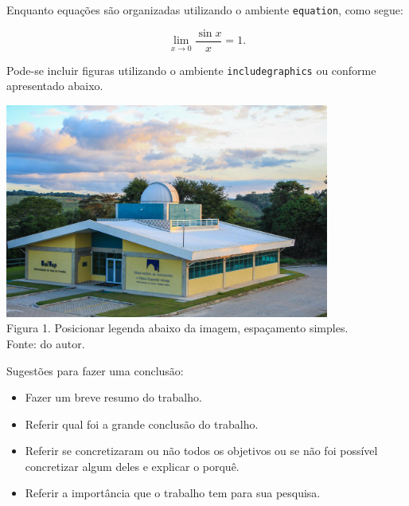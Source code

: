 \documentclass[a0paper,portrait]{baposter}
\begin{document}
\begin{poster}
{Enquanto equações são organizadas utilizando o ambiente \texttt{equation}, como segue:

\begin{equation}
    \label{eq:eq1}
    \lim_{x\to 0}\dfrac{\sin x}{x}=1.
\end{equation}

\vspace{0.8cm}

}

{Pode-se incluir figuras utilizando o ambiente \texttt{includegraphics} ou conforme apresentado abaixo.

\begin{center}
\includegraphics[width=0.8\textwidth]{figures/observatorio.jpg}\\
Figura 1. Posicionar legenda abaixo da imagem, espaçamento simples.\\
Fonte: do autor.
\end{center}

\vspace{1.3cm}
\vspace{9cm}

}

{Sugestões para fazer uma conclusão:
\begin{itemize}
    \item Fazer um breve resumo do trabalho.
    \item Referir qual foi a grande conclusão do trabalho.
    \item Referir se concretizaram ou não todos os objetivos ou se não foi possível concretizar algum deles e explicar o porquê.
    \item Referir a importância que o trabalho tem para sua pesquisa. 
\end{itemize}

}
\end{poster}
\end{document}
